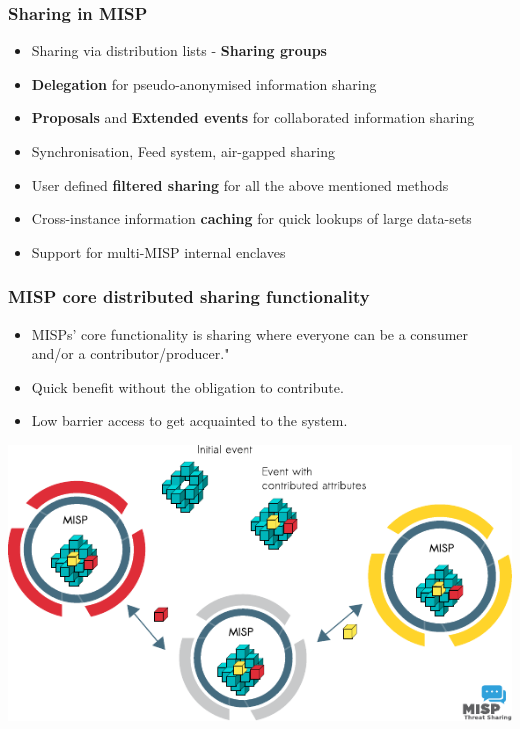 \begin{frame}
\frametitle{Sharing in MISP}
    \begin{itemize}
        \item Sharing via distribution lists - {\bf Sharing groups}
        \item {\bf Delegation} for pseudo-anonymised information sharing
        \item {\bf Proposals} and {\bf Extended events} for collaborated information sharing
        \item Synchronisation, Feed system, air-gapped sharing
        \item User defined {\bf filtered sharing} for all the above mentioned methods
        \item Cross-instance information {\bf caching} for quick lookups of large data-sets
        \item Support for multi-MISP internal enclaves
    \end{itemize}
\end{frame}

\begin{frame}
\frametitle{MISP core distributed sharing functionality}
\begin{itemize}
\item MISPs' core functionality is sharing where everyone can be a consumer and/or a contributor/producer."
\item Quick benefit without the obligation to contribute.
\item Low barrier access to get acquainted to the system.
\end{itemize}
\includegraphics[scale=0.9]{misp-distributed.pdf}
\end{frame}



